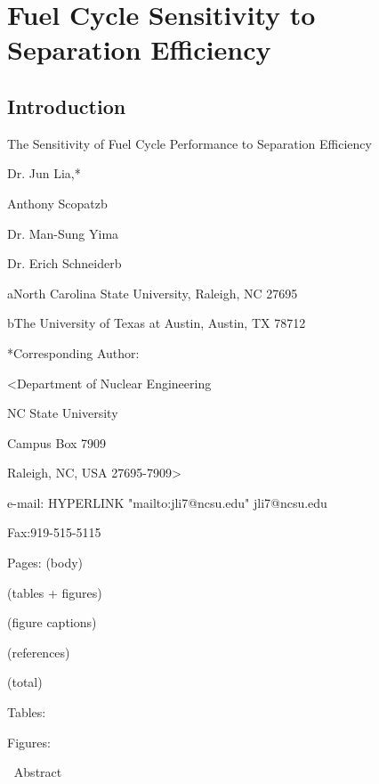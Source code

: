 \chapter{Fuel Cycle Sensitivity to Separation Efficiency}
\label{ses_paper}



\section{Introduction}
\label{ses_sec:intro}

The Sensitivity of Fuel Cycle Performance to Separation Efficiency

Dr. Jun Lia,*

Anthony Scopatzb

Dr. Man-Sung Yima

Dr. Erich Schneiderb

aNorth Carolina State University, Raleigh, NC 27695

bThe University of Texas at Austin, Austin, TX 78712

*Corresponding Author:

<Department of Nuclear Engineering

NC State University

Campus Box 7909

Raleigh, NC, USA  27695-7909>

e-mail:   HYPERLINK "mailto:jli7@ncsu.edu"  jli7@ncsu.edu 

Fax:919-515-5115

Pages: 	 	(body)

(tables + figures)

(figure captions)

(references)

(total)

Tables:

Figures:

Abstract

